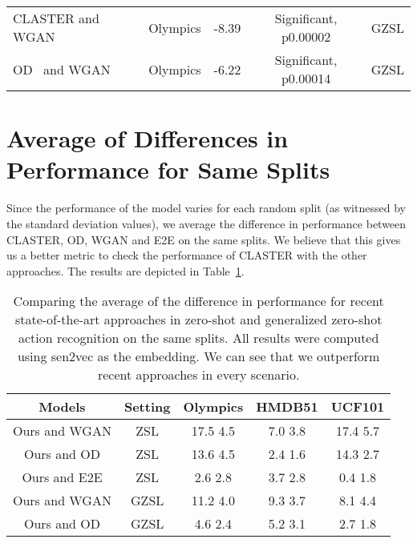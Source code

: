 \documentclass[runningheads]{llncs}
\begin{document}
\begin{table*}
\begin{center}
\begin{tabular}{|l|c|c|c|c|}
CLASTER and WGAN~\cite{clswgan} & Olympics & -8.39 & Significant, p0.00002 & GZSL\\
OD~\cite{OD} and WGAN~\cite{clswgan} & Olympics & -6.22 & Significant, p0.00014 & GZSL\\
\hline
\end{tabular}
\end{center}
\caption{Comparison of the t-test for different pairs of models on the same random split. Lower the value of 'p', higher the significance. As we can see, our results are statistically significant in comparison to both OD~\cite{OD} and WGAN~\cite{clswgan} in both ZSL and GZSL. For GZSL, OD~\cite{OD} also achieves results that are significant in comparison to WGAN~\cite{clswgan}. } 
\label{tab:ttest}
\end{table*}  

\section{Average of Differences in Performance for Same Splits}
\label{sec:avg_diff}

Since the performance of the model varies for each random split (as witnessed by the standard deviation values), we average the difference in performance between CLASTER, OD, WGAN and E2E on the same splits. We believe that this gives us a better metric to check the performance of CLASTER with the other approaches. The results are depicted in Table~\ref{tab:avg_diff}.

\setlength{\tabcolsep}{1.2 pt}
\begin{table}[htb]
\begin{center}
\begin{tabular}{|c|c|c|c|c| }
\hline
Models & Setting & Olympics & HMDB51 & UCF101\\
\hline\hline
Ours and WGAN \cite{clswgan} & ZSL & 17.5  4.5 & 7.0 3.8  & 17.4  5.7\\
Ours and OD \cite{OD} & ZSL & 13.6  4.5 & 2.4  1.6 & 14.3  2.7\\
Ours and E2E \cite{e2e} & ZSL & 2.6  2.8 & 3.7  2.8 & 0.4  1.8\\
\hline
Ours and WGAN \cite{clswgan} & GZSL & 11.2  4.0 & 9.3  3.7 & 8.1  4.4 \\
Ours and OD \cite{OD} & GZSL & 4.6  2.4 & 5.2  3.1 & 2.7  1.8 \\
\hline
\end{tabular}
\end{center}
\caption{Comparing the average of the difference in performance for recent state-of-the-art approaches in zero-shot and generalized zero-shot action recognition on the same splits. All results were computed using sen2vec as the embedding. We can see that we outperform recent approaches in every scenario.} 
\label{tab:avg_diff}
\end{table}
\end{document}
